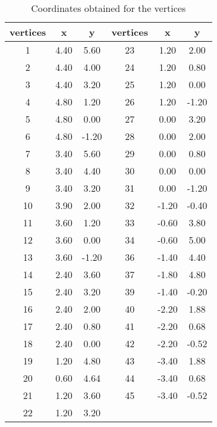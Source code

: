 \begin{table}[]
\centering
\caption{Coordinates obtained for the vertices}
\label{tab:wsuxy}
\begin{tabular}{|c|c|c|c|c|c|}
\hline
vertices & x    & y     &  vertices & x     & y     \\ \hline
1        & 4.40 & 5.60  &  23       & 1.20  & 2.00  \\ \hline
2        & 4.40 & 4.00  &  24       & 1.20  & 0.80  \\ \hline
3        & 4.40 & 3.20  &  25       & 1.20  & 0.00  \\ \hline
4        & 4.80 & 1.20  &  26       & 1.20  & -1.20 \\ \hline
5        & 4.80 & 0.00  &  27       & 0.00  & 3.20  \\ \hline
6        & 4.80 & -1.20 &  28       & 0.00  & 2.00  \\ \hline
7        & 3.40 & 5.60  &  29       & 0.00  & 0.80  \\ \hline
8        & 3.40 & 4.40  &  30       & 0.00  & 0.00  \\ \hline
9        & 3.40 & 3.20  &  31       & 0.00  & -1.20 \\ \hline
10       & 3.90 & 2.00  &  32       & -1.20 & -0.40 \\ \hline
11       & 3.60 & 1.20  &  33       & -0.60 & 3.80  \\ \hline
12       & 3.60 & 0.00  &  34       & -0.60 & 5.00  \\ \hline
13       & 3.60 & -1.20 &  36       & -1.40 & 4.40  \\ \hline
14       & 2.40 & 3.60  &  37       & -1.80 & 4.80  \\ \hline
15       & 2.40 & 3.20  &  39       & -1.40 & -0.20 \\ \hline
16       & 2.40 & 2.00  &  40       & -2.20 & 1.88  \\ \hline
17       & 2.40 & 0.80  &  41       & -2.20 & 0.68  \\ \hline
18       & 2.40 & 0.00  &  42       & -2.20 & -0.52 \\ \hline
19       & 1.20 & 4.80  &  43       & -3.40 & 1.88  \\ \hline
20       & 0.60 & 4.64  &  44       & -3.40 & 0.68  \\ \hline
21       & 1.20 & 3.60  &  45       & -3.40 & -0.52 \\ \hline
22       & 1.20 & 3.20  &           &       &       \\ \hline
\end{tabular}
\end{table}









